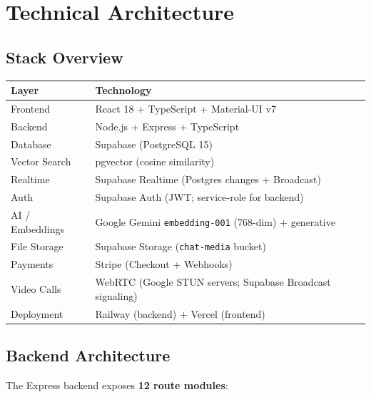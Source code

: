 \documentclass[11pt,a4paper]{article}
\begin{document}
\section{Technical Architecture}

\subsection{Stack Overview}

\begin{center}
\begin{tabular}{ll}
\toprule
\textbf{Layer} & \textbf{Technology} \\
\midrule
Frontend & React 18 + TypeScript + Material-UI v7 \\
Backend & Node.js + Express + TypeScript \\
Database & Supabase (PostgreSQL 15) \\
Vector Search & pgvector (cosine similarity) \\
Realtime & Supabase Realtime (Postgres changes + Broadcast) \\
Auth & Supabase Auth (JWT; service-role for backend) \\
AI / Embeddings & Google Gemini \texttt{embedding-001} (768-dim) + generative \\
File Storage & Supabase Storage (\texttt{chat-media} bucket) \\
Payments & Stripe (Checkout + Webhooks) \\
Video Calls & WebRTC (Google STUN servers; Supabase Broadcast signaling) \\
Deployment & Railway (backend) + Vercel (frontend) \\
\bottomrule
\end{tabular}
\end{center}

\subsection{Backend Architecture}

The Express backend exposes \textbf{12 route modules}:
\end{document}
